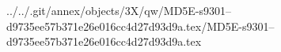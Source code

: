 ../../.git/annex/objects/3X/qw/MD5E-s9301--d9735ee57b371e26e016cc4d27d93d9a.tex/MD5E-s9301--d9735ee57b371e26e016cc4d27d93d9a.tex